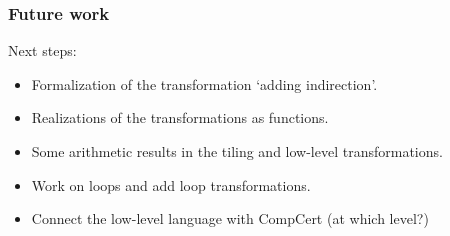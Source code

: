 \begin{frame}[fragile]
\frametitle{Future work}

Next steps:
\\[0.7em]
\begin{itemize}
	\setlength\itemsep{1.5em}
	\item Formalization of the transformation `adding indirection'. %
	\item Realizations of the transformations as functions. %
	\item Some arithmetic results in the tiling and low-level transformations. %
	\item Work on loops and add loop transformations.%
	\item Connect the low-level language with CompCert (at which level?) %
\end{itemize}

\end{frame}


\begin{frame}[fragile]
\frametitle{}


\end{frame}




